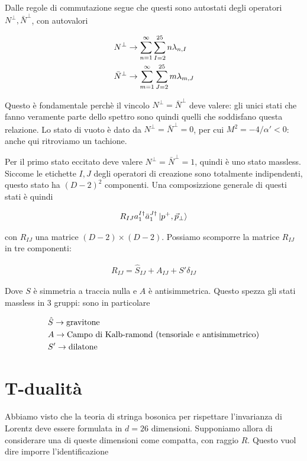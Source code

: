 \documentclass{report}
\begin{document}
Dalle regole di commutazione segue che questi sono autostati degli operatori \(N^\perp, \bar{N}^\perp\), con autovalori 

\begin{align}
    &N^\perp \to \sum_{n=1}^\infty \sum_{I=2}^{25}n \lambda_{n, I} \notag \\ 
    &\bar{N}^\perp \to \sum_{m=1}^\infty \sum_{J=2}^{25}m \lambda_{m, J} 
\end{align}

Questo è fondamentale perchè il vincolo \(N^\perp = \bar{N}^\perp\) deve valere: gli unici stati che fanno veramente parte dello spettro sono quindi quelli che soddisfano questa relazione. Lo stato di vuoto è dato da \(N^\perp = \bar{N}^\perp = 0\), per cui \(M^2 = -4/\alpha' <0\): anche qui ritroviamo un tachione. 

Per il primo stato eccitato deve valere \(N^\perp = \bar{N}^\perp = 1\), quindi è uno stato massless. Siccome le etichette \(I, J\) degli operatori di creazione sono totalmente indipendenti, questo stato ha \((D-2)^2\) componenti. Una composizzione generale di questi stati è quindi 

\begin{align}
    R_{IJ}a_1^{I\dagger} \bar{a}_1^{J\dagger} \ket{p^+, \vec{p}_\perp} 
\end{align}

con \(R_{IJ}\) una matrice \((D-2)\times (D-2)\). Possiamo scomporre la matrice \(R_{IJ}\) in tre componenti: 

\begin{align}
    R_{IJ} = \hat{S}_{IJ} + A_{IJ} + S' \delta_{IJ}
\end{align}

Dove \(S\) è simmetria a traccia nulla e \(A\) è antisimmetrica. Questo spezza gli stati massless in 3 gruppi: sono in particolare 

\begin{align}
    &\hat{S} \to \text{gravitone} \notag \\ 
    &A \to \text{Campo di Kalb-ramond (tensoriale e antisimmetrico)} \notag \\ 
    &S' \to \text{dilatone} \notag 
\end{align}

\section{T-dualità}

Abbiamo visto che la teoria di stringa bosonica per rispettare l'invarianza di Lorentz deve essere formulata in \(d = 26\) dimensioni. Supponiamo allora di considerare una di queste dimensioni come compatta, con raggio \(R\). Questo vuol dire imporre l'identificazione 
\end{document}

